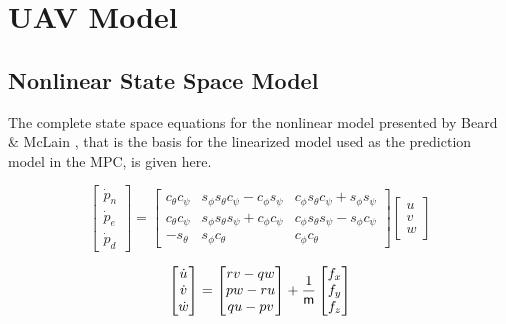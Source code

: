 \chapter{UAV Model}

\section{Nonlinear State Space Model}
\label{ch:nonlinear_model}

The complete state space equations for the nonlinear model presented by Beard \& McLain \cite{uavBEARD}, that is the basis for the linearized model used as the prediction model in the MPC, is given here.

\begin{equation}
	\begin{bmatrix}
	\dot{p}_n \\ \dot{p}_e \\ \dot{p}_d
	\end{bmatrix}
	= 
	\begin{bmatrix}
		c_\theta c_\psi & s_\phi s_\theta c_\psi - c_\phi s_\psi & c_\phi s_\theta c_\psi + s_\phi s_\psi \\
		c_\theta c_\psi & s_\phi s_\theta s_\psi + c_\phi c_\psi & c_\phi s_\theta s_\psi - s_\phi c_\psi \\
		-s_\theta & s_\phi c_\theta & c_\phi c_\theta
	\end{bmatrix}
	\begin{bmatrix}
		u \\ v \\ w
	\end{bmatrix}
\end{equation}

\begin{equation}
\label{eq:vel_dot}
	\begin{bmatrix}
		\dot{u} \\ \dot{v} \\ \dot{w}
	\end{bmatrix}
	=
	\begin{bmatrix}
		rv-qw \\ pw-ru \\ qu-pv
	\end{bmatrix}
	+ \frac{1}{\text{\sffamily m\/}}
	\begin{bmatrix}
		f_x \\ f_y \\ f_z
	\end{bmatrix}
\end{equation}

